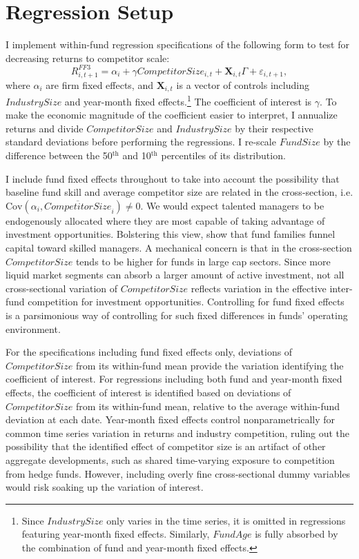 \documentclass[openany]{book}
\let\rmarkdownfootnote\footnote%
\def\footnote{\protect\rmarkdownfootnote}
\theoremstyle{definition}
\theoremstyle{definition}
\theoremstyle{definition}
\theoremstyle{remark}
\begin{document}
\hypertarget{regression-setup}{%
\section{Regression Setup}\label{regression-setup}}

I implement within-fund regression specifications of the following form
to test for decreasing returns to competitor scale: \begin{equation}
R^{FF3}_{i,t+1} = \alpha_i + \gamma CompetitorSize_{i,t} + \mathbf{X}_{i,t}\Gamma + \varepsilon_{i,t+1},
\label{eq:regSpec}
\end{equation} where \(\alpha_i\) are firm fixed effects, and
\(\mathbf{X}_{i,t}\) is a vector of controls including \(IndustrySize\)
and year-month fixed effects.\footnote{Since \(IndustrySize\) only
  varies in the time series, it is omitted in regressions featuring
  year-month fixed effects. Similarly, \(FundAge\) is fully absorbed by
  the combination of fund and year-month fixed effects.} The coefficient
of interest is \(\gamma\). To make the economic magnitude of the
coefficient easier to interpret, I annualize returns and divide
\(CompetitorSize\) and \(IndustrySize\) by their respective standard
deviations before performing the regressions. I re-scale \(FundSize\) by
the difference between the 50\(^\text{th}\) and 10\(^\text{th}\)
percentiles of its distribution.

I include fund fixed effects throughout to take into account the
possibility that baseline fund skill and average competitor size are
related in the cross-section, i.e.
\(\text{Cov}(\alpha_i, \overline{CompetitorSize}_i)\neq 0\). We would
expect talented managers to be endogenously allocated where they are
most capable of taking advantage of investment opportunities. Bolstering
this view, \citet{bbl17} show that fund families funnel capital toward
skilled managers. A mechanical concern is that in the cross-section
\(CompetitorSize\) tends to be higher for funds in large cap sectors.
Since more liquid market segments can absorb a larger amount of active
investment, not all cross-sectional variation of \(CompetitorSize\)
reflects variation in the effective inter-fund competition for
investment opportunities. Controlling for fund fixed effects is a
parsimonious way of controlling for such fixed differences in funds'
operating environment.

For the specifications including fund fixed effects only, deviations of
\(CompetitorSize\) from its within-fund mean provide the variation
identifying the coefficient of interest. For regressions including both
fund and year-month fixed effects, the coefficient of interest is
identified based on deviations of \(CompetitorSize\) from its
within-fund mean, relative to the average within-fund deviation at each
date. Year-month fixed effects control nonparametrically for common time
series variation in returns and industry competition, ruling out the
possibility that the identified effect of competitor size is an artifact
of other aggregate developments, such as shared time-varying exposure to
competition from hedge funds. However, including overly fine
cross-sectional dummy variables would risk soaking up the variation of
interest.
\end{document}
